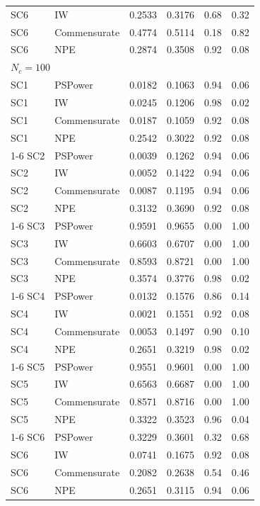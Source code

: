 \begin{longtable}{llcccc}
SC6 & IW           & 0.2533 & 0.3176 & 0.68 & 0.32 \\
SC6 & Commensurate & 0.4774 & 0.5114 & 0.18 & 0.82 \\
SC6 & NPE          & 0.2874 & 0.3508 & 0.92 & 0.08 \\
\midrule
\multicolumn{6}{l}{$N_c=100$} \\
SC1 & PSPower      & 0.0182 & 0.1063 & 0.94 & 0.06 \\
SC1 & IW           & 0.0245 & 0.1206 & 0.98 & 0.02 \\
SC1 & Commensurate & 0.0187 & 0.1059 & 0.92 & 0.08 \\
SC1 & NPE          & 0.2542 & 0.3022 & 0.92 & 0.08 \\
\cmidrule(lr){1-6}
SC2 & PSPower      & 0.0039 & 0.1262 & 0.94 & 0.06 \\
SC2 & IW           & 0.0052 & 0.1422 & 0.94 & 0.06 \\
SC2 & Commensurate & 0.0087 & 0.1195 & 0.94 & 0.06 \\
SC2 & NPE          & 0.3132 & 0.3690 & 0.92 & 0.08 \\
\cmidrule(lr){1-6}
SC3 & PSPower      & 0.9591 & 0.9655 & 0.00 & 1.00 \\
SC3 & IW           & 0.6603 & 0.6707 & 0.00 & 1.00 \\
SC3 & Commensurate & 0.8593 & 0.8721 & 0.00 & 1.00 \\
SC3 & NPE          & 0.3574 & 0.3776 & 0.98 & 0.02 \\
\cmidrule(lr){1-6}
SC4 & PSPower      & 0.0132 & 0.1576 & 0.86 & 0.14 \\
SC4 & IW           & 0.0021 & 0.1551 & 0.92 & 0.08 \\
SC4 & Commensurate & 0.0053 & 0.1497 & 0.90 & 0.10 \\
SC4 & NPE          & 0.2651 & 0.3219 & 0.98 & 0.02 \\
\cmidrule(lr){1-6}
SC5 & PSPower      & 0.9551 & 0.9601 & 0.00 & 1.00 \\
SC5 & IW           & 0.6563 & 0.6687 & 0.00 & 1.00 \\
SC5 & Commensurate & 0.8571 & 0.8716 & 0.00 & 1.00 \\
SC5 & NPE          & 0.3322 & 0.3523 & 0.96 & 0.04 \\
\cmidrule(lr){1-6}
SC6 & PSPower      & 0.3229 & 0.3601 & 0.32 & 0.68 \\
SC6 & IW           & 0.0741 & 0.1675 & 0.92 & 0.08 \\
SC6 & Commensurate & 0.2082 & 0.2638 & 0.54 & 0.46 \\
SC6 & NPE          & 0.2651 & 0.3115 & 0.94 & 0.06 \\
\bottomrule
\end{longtable}
\normalsize
\renewcommand{\arraystretch}{1}

